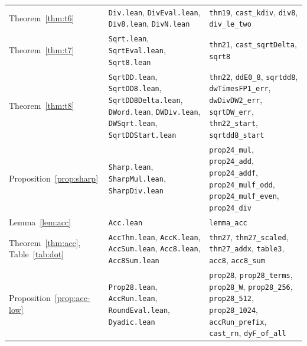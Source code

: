 \begin{table}[tp]
\begin{tabular}{@{}>{\raggedright\arraybackslash}p{3.3cm}>{\raggedright\arraybackslash}p{5.0cm}>{\raggedright\arraybackslash}p{8.6cm}@{}}
Theorem~\ref{thm:t6} & \texttt{Div.lean}, \texttt{DivEval.lean}, \texttt{Div8.lean}, \texttt{DivN.lean} &
  \texttt{thm19}, \texttt{cast\_kdiv}, \texttt{div8}, \texttt{div\_le\_two} \\
Theorem~\ref{thm:t7} & \texttt{Sqrt.lean}, \texttt{SqrtEval.lean}, \texttt{Sqrt8.lean} & \texttt{thm21},
  \texttt{cast\_sqrtDelta}, \texttt{sqrt8} \\
Theorem~\ref{thm:t8} & \texttt{SqrtDD.lean}, \texttt{SqrtDD8.lean}, \texttt{SqrtDD8Delta.lean},
  \texttt{DWord.lean}, \texttt{DWDiv.lean}, \texttt{DWSqrt.lean}, \texttt{SqrtDDStart.lean} & \texttt{thm22},
  \texttt{ddE0\_8}, \texttt{sqrtdd8}, \texttt{dwTimesFP1\_err}, \texttt{dwDivDW2\_err}, \texttt{sqrtDW\_err},
  \texttt{thm22\_start}, \texttt{sqrtdd8\_start} \\
Proposition~\ref{prop:sharp} & \texttt{Sharp.lean}, \texttt{SharpMul.lean}, \texttt{SharpDiv.lean} &
  \texttt{prop24\_mul}, \texttt{prop24\_add}, \texttt{prop24\_addf}, \texttt{prop24\_mulf\_odd},
  \texttt{prop24\_mulf\_even}, \texttt{prop24\_div} \\
Lemma~\ref{lem:acc} & \texttt{Acc.lean} & \texttt{lemma\_acc} \\
Theorem~\ref{thm:acc}, Table~\ref{tab:dot} & \texttt{AccThm.lean}, \texttt{AccK.lean}, \texttt{AccSum.lean},
  \texttt{Acc8.lean}, \texttt{Acc8Sum.lean} & \texttt{thm27}, \texttt{thm27\_scaled}, \texttt{thm27\_addx},
  \texttt{table3}, \texttt{acc8}, \texttt{acc8\_sum} \\
Proposition~\ref{prop:acc-low} & \texttt{Prop28.lean}, \texttt{AccRun.lean}, \texttt{RoundEval.lean},
  \texttt{Dyadic.lean} & \texttt{prop28}, \texttt{prop28\_terms}, \texttt{prop28\_W}, \texttt{prop28\_256},
  \texttt{prop28\_512}, \texttt{prop28\_1024}, \texttt{accRun\_prefix}, \texttt{cast\_rn}, \texttt{dyF\_of\_all} \\
\bottomrule
\end{tabular}
\end{table}

